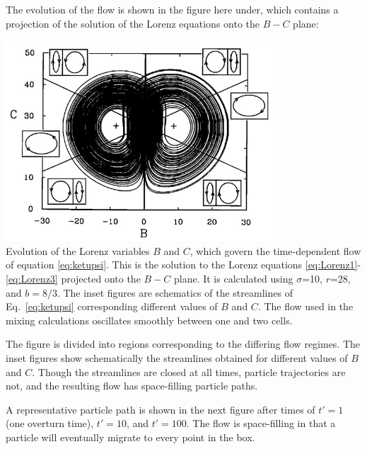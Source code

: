 The evolution of the flow is shown in the figure here under, 
which contains a projection of the solution of the Lorenz equations 
onto the $B-C$ plane:

\begin{center}
\includegraphics[width=10cm]{python_codes/fieldstone_156/images/ketu90a}\\
{\captionfont Evolution of the Lorenz variables $B$ and $C$,
which govern the time-dependent flow of equation \eqref{eq:ketupsi}.
This is the solution to the Lorenz equations
\eqref{eq:Lorenz1}-\eqref{eq:Lorenz3} projected onto the $B-C$ plane. It is calculated
using  $\sigma$=10, $r$=28, and $b = 8/3$. The inset figures are
schematics of the streamlines of Eq.~\eqref{eq:ketupsi} corresponding
different values of $B$ and $C$. The flow used in the mixing 
calculations oscillates smoothly between one and two cells.}
\end{center}

The figure is divided into regions corresponding
to the differing flow regimes. The inset figures
show schematically the streamlines obtained for
different values of $B$ and $C$. Though the streamlines
are closed at all times, particle trajectories are not, and
the resulting flow has space-filling particle paths.

A representative particle path is shown in the next figure
after times of $t'=1$ (one overturn time), $t'=10$, and $t'=100$.
The flow is space-filling in that a particle will eventually
migrate to every point in the box. 


